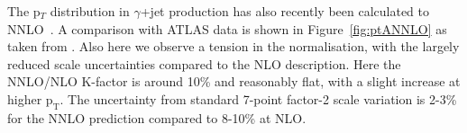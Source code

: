 \documentclass[a4paper,11pt,notoc]{article}
\newcommand{\pt}{\ensuremath{\mathrm{p_T}}}
\newcommand{\ptZ}{\ensuremath{\mathrm{p_T^{Z}}}}
\begin{document}
The p$_T$ distribution in $\gamma$+jet production has also recently been calculated to NNLO~\cite{Campbell:2016lzl,Campbell:2017dqk}. A comparison with
 ATLAS data is shown in Figure~\ref{fig:ptANNLO} as taken from \cite{Campbell:2017dqk}. 
 Also here we observe a tension in the normalisation, with the largely reduced scale uncertainties 
compared to the NLO description. Here the NNLO/NLO K-factor is around 10\% and reasonably flat, with a slight
increase at higher \pt.
The uncertainty from standard 7-point factor-2 scale variation is 2-3\% for the NNLO prediction compared
to 8-10\% at NLO. 


\end{document}
